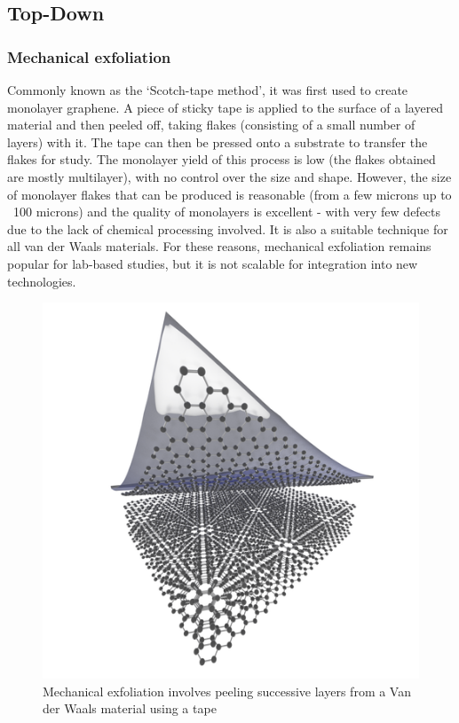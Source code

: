 \documentclass[12pt,a4paper]{report}
\begin{document}
\begin{itemize}
\subsection{Top-Down}

\subsubsection{Mechanical exfoliation}
Commonly known as the ‘Scotch-tape method’, it was first used to create monolayer graphene. A piece of sticky tape is applied to the surface of a layered material and then peeled off, taking flakes (consisting of a small number of layers) with it. The tape can then be pressed onto a substrate to transfer the flakes for study. The monolayer yield of this process is low (the flakes obtained are mostly multilayer), with no control over the size and shape. However, the size of monolayer flakes that can be produced is reasonable (from a few microns up to ~100 microns) and the quality of monolayers is excellent - with very few defects due to the lack of chemical processing involved.
It is also a suitable technique for all van der Waals materials. For these reasons, mechanical exfoliation remains popular for lab-based studies, but it is not scalable for integration into new technologies.

\begin{figure}
  \centering
  \includegraphics[scale=0.3]{2.1.1.png}
  \caption{Mechanical exfoliation involves peeling successive layers from a Van der Waals material using a tape}
  \label{mechexfol}
  \end{figure}


\end{itemize}
\end{document}

